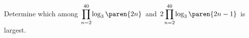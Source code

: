 Determine which among
$\mspace{2mu} \displaystyle{\prod\limits_{n = 2}^{40} {\mspace{-2mu} \log_{3}\paren{2 n}}} \mspace{2mu}$ and
$\mspace{2mu} \displaystyle{2 \mspace{-1mu} \prod\limits_{n = 2}^{40} {\mspace{-2mu} \log_{3}\paren{2 n - 1}}} \mspace{2mu}$
is largest.
